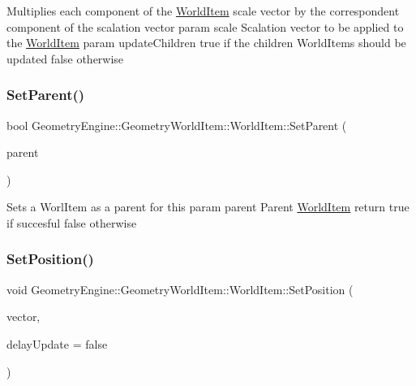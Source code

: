 Multiplies each component of the \mbox{\hyperlink{class_geometry_engine_1_1_geometry_world_item_1_1_world_item}{World\+Item}} scale vector by the correspondent component of the scalation vector param scale Scalation vector to be applied to the \mbox{\hyperlink{class_geometry_engine_1_1_geometry_world_item_1_1_world_item}{World\+Item}} param update\+Children true if the children World\+Items should be updated false otherwise \mbox{\label{class_geometry_engine_1_1_geometry_world_item_1_1_world_item_acb8c065c43621ce13f95205129a1d686}} 
\subsubsection{\texorpdfstring{SetParent()}{SetParent()}}
{\footnotesize\ttfamily bool Geometry\+Engine\+::\+Geometry\+World\+Item\+::\+World\+Item\+::\+Set\+Parent (\begin{DoxyParamCaption}\item[{\mbox{\hyperlink{class_geometry_engine_1_1_geometry_world_item_1_1_world_item}{World\+Item}} $\ast$}]{parent }\end{DoxyParamCaption})}

Sets a Worl\+Item as a parent for this param parent Parent \mbox{\hyperlink{class_geometry_engine_1_1_geometry_world_item_1_1_world_item}{World\+Item}} return true if succesful false otherwise \mbox{\label{class_geometry_engine_1_1_geometry_world_item_1_1_world_item_a81a1c5d0a550a56cc89d7e4e7f3c5c49}} 
\subsubsection{\texorpdfstring{SetPosition()}{SetPosition()}}
{\footnotesize\ttfamily void Geometry\+Engine\+::\+Geometry\+World\+Item\+::\+World\+Item\+::\+Set\+Position (\begin{DoxyParamCaption}\item[{const Q\+Vector3D \&}]{vector,  }\item[{bool}]{delay\+Update = {\ttfamily false} }\end{DoxyParamCaption})}

